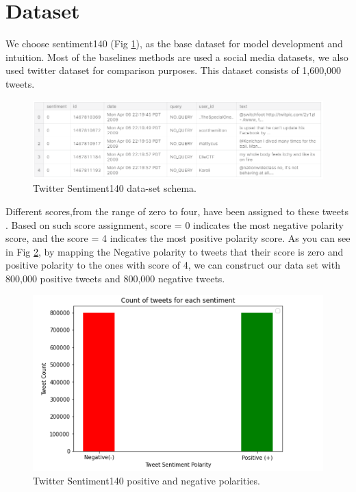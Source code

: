 \documentclass[journal]{IEEEtran}
\begin{document}
\section{Dataset}
We choose sentiment140 (Fig \ref{fig:dataset}), as the base dataset for model development and intuition. Most of the baselines methods are used a social media datasets, we also used twitter dataset for comparison purposes. This dataset consists of 1,600,000 tweets.

\begin{figure}[t]
\centering
\includegraphics[width=1\columnwidth]{Dataset.PNG}
\caption{\small Twitter Sentiment140 data-set schema.}
    \label{fig:dataset}
\end{figure}


Different scores,from the range of zero to four, have been assigned to these tweets . Based on such score assignment, score = 0 indicates the most negative polarity score, and the score = 4 indicates the most positive polarity score. As you can see in Fig \ref{fig:datasetstat}, by mapping the Negative polarity to tweets that their score is zero and positive polarity to the ones with score of 4, we can construct our data set with 800,000 positive tweets and 800,000 negative tweets. 


\begin{figure}[t]
\centering
\includegraphics[width=1\columnwidth]{Dataset Lable Dist.PNG}
\caption{\small Twitter Sentiment140 positive and negative polarities.}
    \label{fig:datasetstat}
\end{figure}
\end{document}
